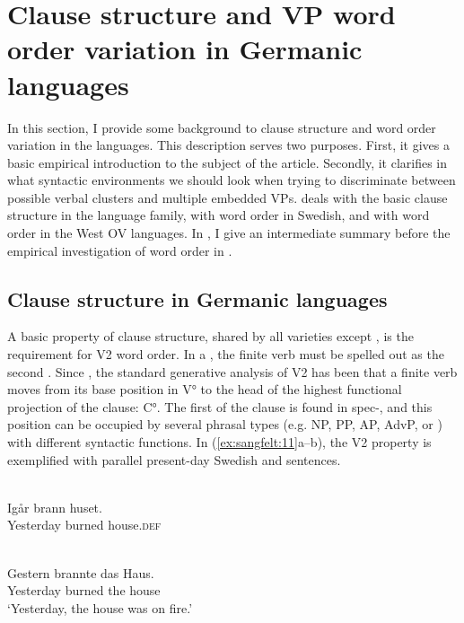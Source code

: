 \documentclass[output=paper, colorlinks, citecolor=brown]{langscibook}
\begin{document}
\section{Clause structure and VP word order variation in Germanic languages}\label{sec:sangfelt:3}

In this section, I provide some background to clause structure and  word order variation in the  languages. This description serves two purposes. First, it gives a basic empirical introduction to the subject of the article. Secondly, it clarifies in what syntactic environments we should look when trying to discriminate between possible verbal clusters and multiple embedded VPs.  deals with the basic clause structure in the  language family,  with  word order in Swedish, and  with  word order in the West  OV languages. In , I give an intermediate summary before the empirical investigation of  word order in .

\subsection{Clause structure in Germanic languages}\label{sec:sangfelt:3.1}

A basic property of  clause structure, shared by all varieties except , is the requirement for V2 word order. In a  , the finite verb must be spelled out as the second . Since \citet{denBesten1983}, the standard generative analysis of V2 has been that a finite verb moves from its base position in V° to the head of the highest functional projection of the clause: C°. The first  of the clause is found in spec-, and this position can be occupied by several phrasal types (e.g. NP, PP, AP, AdvP, or ) with different syntactic functions. In (\ref{ex:sangfelt:11}a–b), the V2 property is exemplified with parallel present-day Swedish and  sentences.

\ea
\label{ex:sangfelt:11}
\begin{multicols}{2}\raggedcolumns
\ea {}\\
\gll Igår brann huset. \\
 Yesterday burned house.\textsc{def}\\\label{ex:sangfelt:11a}\columnbreak
 
\ex {}\\
\gll Gestern brannte das Haus.\\
 Yesterday burned the house\\
\glt ‘Yesterday, the house was on fire.’\label{ex:sangfelt:11b}
\z 
\end{multicols}
\z 
\end{document}
